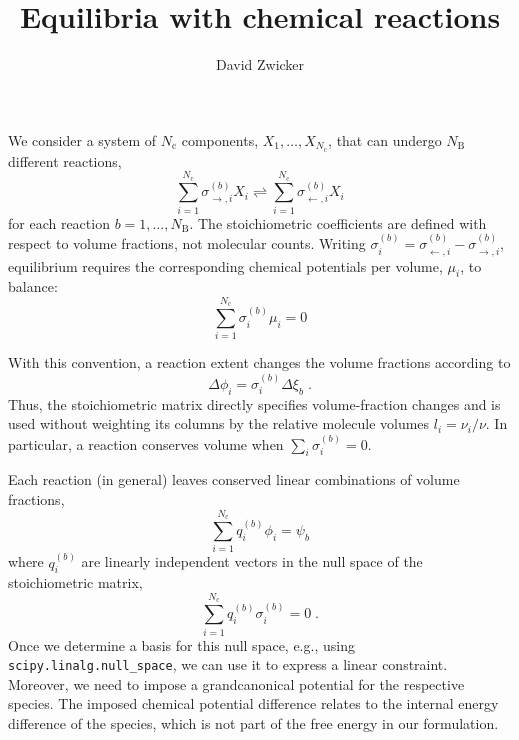 \documentclass[reprint,onecolumn,groupedaddress,amsmath,amssymb]{revtex4-2}
\newcommand{\Nc}{N_\mathrm{c}}
\newcommand{\Nb}{N_\mathrm{B}}
\begin{document}
\title{Equilibria with chemical reactions}

\author{David Zwicker}

\maketitle

We consider a system of $\Nc$ components, $X_1, \ldots, X_{\Nc}$, that can undergo $\Nb$ different reactions,
\begin{equation}
    \sum_{i=1}^{\Nc} \sigma^{(b)}_{\rightarrow, i} X_i
    \rightleftharpoons
    \sum_{i=1}^{\Nc} \sigma^{(b)}_{\leftarrow, i} X_i
\end{equation}
for each reaction $b=1,\ldots, \Nb$.
The stoichiometric coefficients are defined with respect to volume fractions, not
molecular counts. Writing $\sigma^{(b)}_i =
\sigma^{(b)}_{\leftarrow, i}-\sigma^{(b)}_{\rightarrow, i}$, equilibrium requires
the corresponding chemical potentials per volume, $\mu_i$, to balance:
\begin{equation}
    \sum_{i=1}^{\Nc} \sigma^{(b)}_i \mu_i = 0
\end{equation}

With this convention, a reaction extent changes the volume fractions according to
\begin{equation}
    \Delta \phi_i = \sigma^{(b)}_i \Delta \xi_b \;.
\end{equation}
Thus, the stoichiometric matrix directly specifies volume-fraction changes and is used
without weighting its columns by the relative molecule volumes $l_i=\nu_i/\nu$.
In particular, a reaction conserves volume when $\sum_i \sigma^{(b)}_i=0$.

Each reaction (in general) leaves conserved linear combinations of volume fractions,
\begin{equation}
    \sum_{i=1}^{\Nc} q^{(b)}_i \phi_i = \psi_b
\end{equation}
where $q^{(b)}_i$ are linearly independent vectors in the null space of the
stoichiometric matrix,
\begin{equation}
    \sum_{i=1}^{\Nc} q^{(b)}_i \sigma^{(b)}_i = 0
    \;.
\end{equation}
Once we determine a basis for this null space, e.g., using
\texttt{scipy.linalg.null\_space}, we can use it to express a linear constraint.
Moreover, we need to impose a grandcanonical potential for the respective species.
The imposed chemical potential difference relates to the internal energy difference
of the species, which is not part of the free energy in our formulation.
\end{document}

